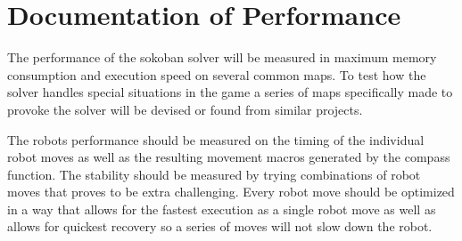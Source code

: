 \documentclass[journal,10pt]{IEEEtran} %
\begin{document}
\section{Documentation of Performance}
The performance of the sokoban solver will be measured in maximum memory consumption and execution speed on several common maps.
To test how the solver handles special situations in the game a series of maps specifically made to provoke the solver will be devised or found from similar projects.

The robots performance should be measured on the timing of the individual robot moves as well as the resulting movement macros generated by the compass function.
The stability should be measured by trying combinations of robot moves that proves to be extra challenging.
Every robot move should be optimized in a way that allows for the fastest execution as a single robot move as well as allows for quickest recovery so a series of moves will not slow down the robot.


\end{document}

